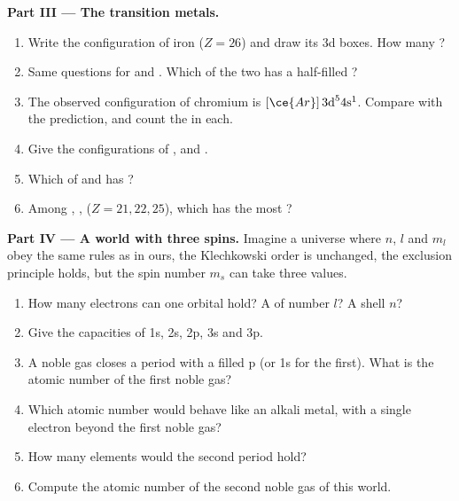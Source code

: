 \begin{problem}
\medskip
\noindent\textbf{Part III --- The transition metals.}
\begin{enumerate}[resume]
  \item Write the configuration of iron ($Z = 26$) and draw its 3d
        boxes. How many ?
  \item Same questions for  and . Which of the two
        has a half-filled ?
  \item The observed configuration of chromium is $[\ce{Ar}]\,3\text{d}^5
        4\text{s}^1$. Compare with the prediction, and count the  in each.
  \item Give the configurations of ,  and .
  \item Which of  and  has ?
  \item Among , ,  ($Z = 21, 22, 25$),
        which has the most ?
\end{enumerate}

\medskip
\noindent\textbf{Part IV --- A world with three spins.}
Imagine a universe where $n$, $l$ and $m_l$ obey the same rules as in
ours, the Klechkowski order is unchanged, the exclusion principle holds,
but the spin number $m_s$ can take three values.
\begin{enumerate}[resume]
  \item How many electrons can one orbital hold? A  of number
        $l$? A shell $n$?
  \item Give the capacities of 1s, 2s, 2p, 3s and 3p.
  \item A noble gas closes a period with a filled p  (or 1s for
        the first). What is the atomic number of the first noble gas?
  \item Which atomic number would behave like an alkali metal, with a
        single electron beyond the first noble gas?
  \item How many elements would the second period hold?
  \item Compute the atomic number of the second noble gas of this world.
\end{enumerate}
\end{problem}
